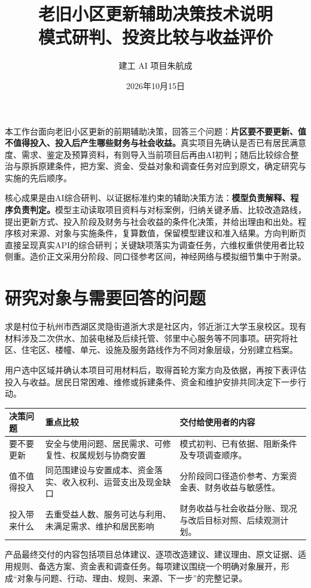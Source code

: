 \documentclass[UTF8,11pt,fontset=windows]{ctexart}
\title{\bfseries\Large 老旧小区更新辅助决策技术说明\\模式研判、投资比较与收益评价}
\author{\normalsize 建工 AI 项目\quad 朱航成}
\date{\small 2026年10月15日}
\begin{document}
\maketitle
\vspace{-6mm}

本工作台面向老旧小区更新的前期辅助决策，回答三个问题：\textbf{片区要不要更新、值不值得投入、投入后产生哪些财务与社会收益。}真实项目先确认是否已有居民满意度、需求、鉴定及预算资料，有则导入当前项目后再由AI初判；随后比较综合整治与原拆原建条件，把方案、资金、受益对象和调查任务对应到原文，确定研究与实施的先后顺序。

核心成果是由AI综合研判、以证据标准约束的辅助决策方法：\textbf{模型负责解释、程序负责判定。}模型主动读取项目资料与对标案例，归纳关键矛盾、比较改造路线，提出更新方式、投入阶段及财务与社会收益的条件化决策，并给出理由和出处。程序核对来源、对象与实施条件，复算数值，保留模型建议和准入结果。方向判断页直接呈现真实API的综合研判；关键缺项落实为调查任务，六维权重供使用者比较侧重。造价正文采用分阶段、同口径参考区间，神经网络与模拟细节集中于附录。

\section{研究对象与需要回答的问题}

求是村位于杭州市西湖区灵隐街道浙大求是社区内，邻近浙江大学玉泉校区。现有材料涉及二次供水、加装电梯及后续托管、邻里中心服务等不同事项。研究将社区、住宅区、楼幢、单元、设施及服务路线作为不同对象层级，分别建立档案。

用户选中区域并确认本项目可用材料后，取得首轮方案方向及依据，再按下表评估投入与收益。居民日常困难、维修或拆建条件、资金和维护安排共同决定下一步行动。

\begin{longtable}{@{}L{31mm}L{67mm}L{61mm}@{}}
\toprule\textbf{决策问题}&\textbf{重点比较}&\textbf{交付给使用者的内容}\\\midrule
要不要更新&安全与使用问题、居民需求、可修复性、权属规划与协商安置&模式初判、已有依据、阻断条件及专项调查顺序。\\
值不值得投入&同范围建设与安置成本、资金落实、收入权利、运营支出及现金缺口&分阶段同口径造价参考、方案资金表、财务收益与敏感性。\\
投入带来什么&去重受益人数、服务可达与利用、未满足需求、维护和居民影响&财务收益与社会收益分账、现况与改后目标对照、后续观测计划。\\
\bottomrule\end{longtable}

产品最终交付的内容包括项目总体建议、逐项改造建议、建议理由、原文证据、适用规则、备选方案、资金表和调查任务。每项建议围绕一个明确对象展开，形成“对象与问题、行动、理由、规则、来源、下一步”的完整记录。
\end{document}
